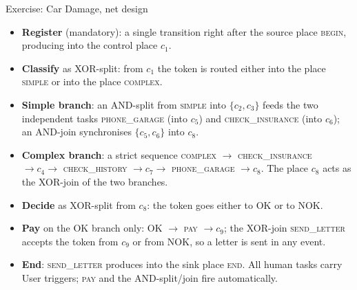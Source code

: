 \begin{examplebox}{Exercise: Car Damage, net design}
\begin{itemize}
  \item \textbf{Register} (mandatory): a single transition right after the source place \textsc{begin}, producing into the control place $c_1$.
  \item \textbf{Classify} as XOR-split: from $c_1$ the token is routed either into the place \textsc{simple} or into the place \textsc{complex}.
  \item \textbf{Simple branch}: an AND-split from \textsc{simple} into $\{c_2, c_3\}$ feeds the two independent tasks \textsc{phone\_garage} (into $c_5$) and \textsc{check\_insurance} (into $c_6$); an AND-join synchronises $\{c_5, c_6\}$ into $c_8$.
  \item \textbf{Complex branch}: a strict sequence \textsc{complex} $\to$ \textsc{check\_insurance} $\to c_4 \to$ \textsc{check\_history} $\to c_7 \to$ \textsc{phone\_garage} $\to c_8$. The place $c_8$ acts as the XOR-join of the two branches.
  \item \textbf{Decide} as XOR-split from $c_8$: the token goes either to \textsc{OK} or to \textsc{NOK}.
  \item \textbf{Pay} on the OK branch only: \textsc{OK} $\to$ \textsc{pay} $\to c_9$; the XOR-join \textsc{send\_letter} accepts the token from $c_9$ or from \textsc{NOK}, so a letter is sent in any event.
  \item \textbf{End}: \textsc{send\_letter} produces into the sink place \textsc{end}. All human tasks carry User triggers; \textsc{pay} and the AND-split/join fire automatically.
\end{itemize}


\end{examplebox}
